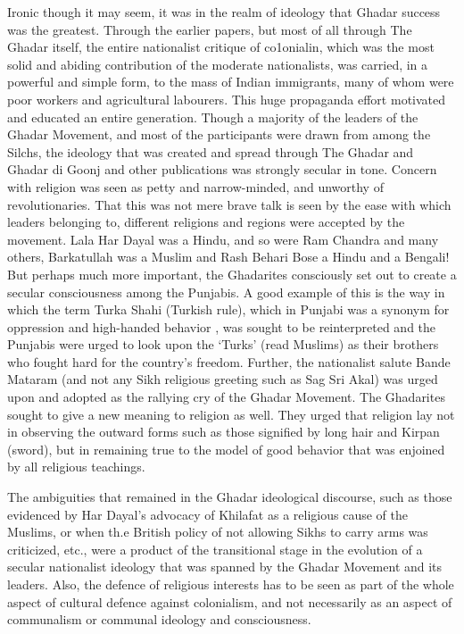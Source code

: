 Ironic though it may seem, it was in the realm of ideology that Ghadar success was the greatest. Through the earlier papers, but most of all through The Ghadar itself, the entire nationalist critique of co1onialin, which was the most solid and abiding contribution of the moderate nationalists, was carried, in a powerful and simple form, to the mass of Indian immigrants, many of whom were poor workers and agricultural labourers. This huge propaganda effort motivated and educated an entire generation. Though a majority of the leaders of the Ghadar Movement, and most of the participants were drawn from among the Silchs, the ideology that was created and spread through The Ghadar and Ghadar di Goonj and other publications was strongly secular in tone. Concern with religion was seen as petty and narrow-minded, and unworthy of revolutionaries. That this was not mere brave talk is seen by the ease with which leaders belonging to, different religions and regions were accepted by the movement. Lala Har Dayal was a Hindu, and so were Ram Chandra and many others, Barkatullah was a Muslim and Rash Behari Bose a Hindu and a Bengali! But perhaps much more important, the Ghadarites consciously set out to create a secular consciousness among the Punjabis. A good example of this is the way in which the term Turka Shahi (Turkish rule), which in Punjabi was a synonym for oppression and high-handed behavior , was sought to be reinterpreted and the Punjabis were urged to look upon the ‘Turks’ (read Muslims) as their brothers who fought hard for the country’s freedom. Further, the nationalist salute Bande Mataram (and not any Sikh religious greeting such as Sag Sri Akal) was urged upon and adopted as the rallying cry of the Ghadar Movement. The Ghadarites sought to give a new meaning to religion as well. They urged that religion lay not in observing the outward forms such as those signified by long hair and Kirpan (sword), but in remaining true to the model of good behavior that was enjoined by all religious teachings.

The ambiguities that remained in the Ghadar ideological discourse, such as those evidenced by Har Dayal’s advocacy of Khilafat as a religious cause of the Muslims, or when th.e British policy of not allowing Sikhs to carry arms was criticized, etc., were a product of the transitional stage in the evolution of a secular nationalist ideology that was spanned by the Ghadar Movement and its leaders. Also, the defence of religious interests has to be seen as part of the whole aspect of cultural defence against colonialism, and not necessarily as an aspect of communalism or communal ideology and consciousness.

